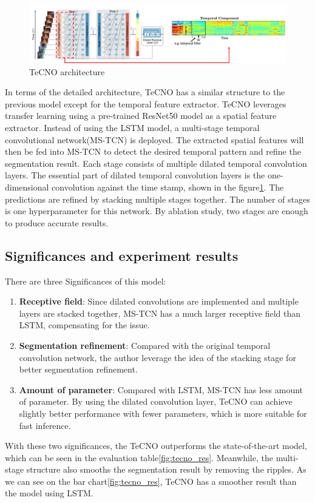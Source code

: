 \documentclass[11pt]{article} \usepackage[top=1in, bottom=1in, left=1in, right=1in]{geometry}
\begin{document}
\begin{figure}[H]
  \includegraphics[width=\textwidth]{TeCNO_arch.png}
  \centering
  \caption{ TeCNO architecture \cite{TeCNO}}
  \label{fig:tecno_arch}
\end{figure}

In terms of the detailed architecture, TeCNO has a similar structure to the previous model except for the temporal feature extractor. TeCNO leverages transfer learning using a pre-trained ResNet50 model as a spatial feature extractor. Instead of using the LSTM model, a multi-stage temporal convolutional network(MS-TCN) is deployed. The extracted spatial features will then be fed into MS-TCN to detect the desired temporal pattern and refine the segmentation result. Each stage consists of multiple dilated temporal convolution layers. The essential part of dilated temporal convolution layers is the one-dimensional convolution against the time stamp, shown in the figure\ref{fig:tecno_arch}. The predictions are refined by stacking multiple stages together. The number of stages is one hyperparameter for this network. By ablation study, two stages are enough to produce accurate results. 

\subsection{Significances and experiment results}
There are three Significances of this model:
\begin{enumerate}
  \item \textbf{Receptive field}: Since dilated convolutions are implemented and multiple layers are stacked together, MS-TCN has a much larger receptive field than LSTM, compensating for the issue. 
  \item \textbf{Segmentation refinement}: Compared with the original temporal convolution network, the author leverage the idea of the stacking stage for better segmentation refinement.
  \item \textbf{Amount of parameter}: Compared with LSTM, MS-TCN has less amount of parameter. By using the dilated convolution layer, TeCNO can achieve slightly better performance with fewer parameters, which is more suitable for fast inference. 
\end{enumerate}
With these two significances, the TeCNO outperforms the state-of-the-art model, which can be seen in the evaluation table\ref{fig:tecno_res}. Meanwhile, the multi-stage structure also smooths the segmentation result by removing the ripples. As we can see on the bar chart\ref{fig:tecno_res}, TeCNO has a smoother result than the model using LSTM.
\end{document}
